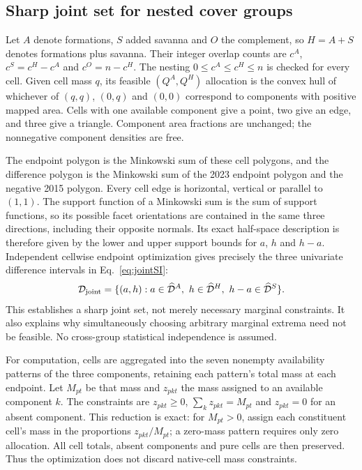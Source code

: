 \subsection{Sharp joint set for nested cover groups}
Let $A$ denote formations, $S$ added savanna and $O$ the complement, so $H=A+S$ denotes formations plus savanna. Their integer overlap counts are $c^A$, $c^S=c^H-c^A$ and $c^O=n-c^H$. The nesting $0\le c^A\le c^H\le n$ is checked for every cell. Given cell mass $q$, its feasible $(Q^A,Q^H)$ allocation is the convex hull of whichever of $(q,q)$, $(0,q)$ and $(0,0)$ correspond to components with positive mapped area. Cells with one available component give a point, two give an edge, and three give a triangle. Component area fractions are unchanged; the nonnegative component densities are free.

The endpoint polygon is the Minkowski sum of these cell polygons, and the difference polygon is the Minkowski sum of the 2023 endpoint polygon and the negative 2015 polygon. Every cell edge is horizontal, vertical or parallel to $(1,1)$. The support function of a Minkowski sum is the sum of support functions, so its possible facet orientations are contained in the same three directions, including their opposite normals. Its exact half-space description is therefore given by the lower and upper support bounds for $a$, $h$ and $h-a$. Independent cellwise endpoint optimization gives precisely the three univariate difference intervals in Eq.~\ref{eq:jointSI}:
\begin{equation}
\mathcal D_{\rm joint}=\{(a,h):a\in\widehat{\mathcal D}^A,\ h\in\widehat{\mathcal D}^H,\ h-a\in\widehat{\mathcal D}^S\}.\label{eq:jointSI}
\end{equation}
This establishes a sharp joint set, not merely necessary marginal constraints. It also explains why simultaneously choosing arbitrary marginal extrema need not be feasible. No cross-group statistical independence is assumed.

For computation, cells are aggregated into the seven nonempty availability patterns of the three components, retaining each pattern's total mass at each endpoint. Let $M_{pt}$ be that mass and $z_{pkt}$ the mass assigned to an available component $k$. The constraints are $z_{pkt}\ge0$, $\sum_kz_{pkt}=M_{pt}$ and $z_{pkt}=0$ for an absent component. This reduction is exact: for $M_{pt}>0$, assign each constituent cell's mass in the proportions $z_{pkt}/M_{pt}$; a zero-mass pattern requires only zero allocation. All cell totals, absent components and pure cells are then preserved. Thus the optimization does not discard native-cell mass constraints.

